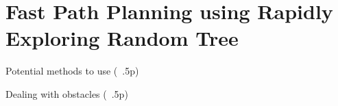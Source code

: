 \section{Fast Path Planning using Rapidly Exploring Random Tree \label{sec:rrt}}
Potential methods to use (~.5p)

Dealing with obstacles (~.5p)